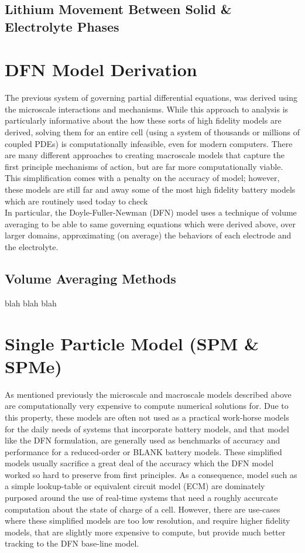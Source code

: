 \documentclass[lettersize,journal]{IEEEtran}
\begin{document}
\subsection{Lithium Movement Between Solid \& Electrolyte Phases}


\section{DFN Model Derivation}

The previous system of governing partial differential equations, was derived using the microscale interactions and mechanisms. While this approach to analysis is particularly informative about the how these sorts of high fidelity models are derived, solving them for an entire cell (using a system of thousands or millions of coupled PDEs) is computationally infeasible, even for modern computers. There are many different approaches to creating macroscale models that capture the first principle mechanisms of action, but are far more computationally viable. This simplification comes with a penalty on the accuracy of model; however, these models are still far and away some of the most high fidelity battery models which are routinely used today to check  \\

In particular, the Doyle-Fuller-Newman (DFN) model uses a technique of volume averaging to be able to same governing equations which were derived above, over larger domains, approximating (on average) the behaviors of each electrode and the electrolyte. \\

\subsection{Volume Averaging Methods}

blah blah blah 

\section{Single Particle Model (SPM \& SPMe)}

As mentioned previously the microscale and macroscale models described above are computationally very expensive to compute numerical solutions for. Due to this property, these models are often not used as a practical work-horse models for the daily needs of systems that incorporate battery models, and that model like the DFN formulation, are generally used as benchmarks of accuracy and performance for a reduced-order or BLANK battery models. These simplified models usually sacrifice a great deal of the accuracy which the DFN model worked so hard to preserve from first principles. As a consequence, model such as a simple lookup-table or equivalent circuit model (ECM) are dominately purposed around the use of real-time systems that need a roughly accurcate computation about the state of charge of a cell. However, there are use-cases where these simplified models are too low resolution, and require higher fidelity models, that are slightly more expensive to compute, but provide much better tracking to the DFN base-line model. \\
\end{document}
